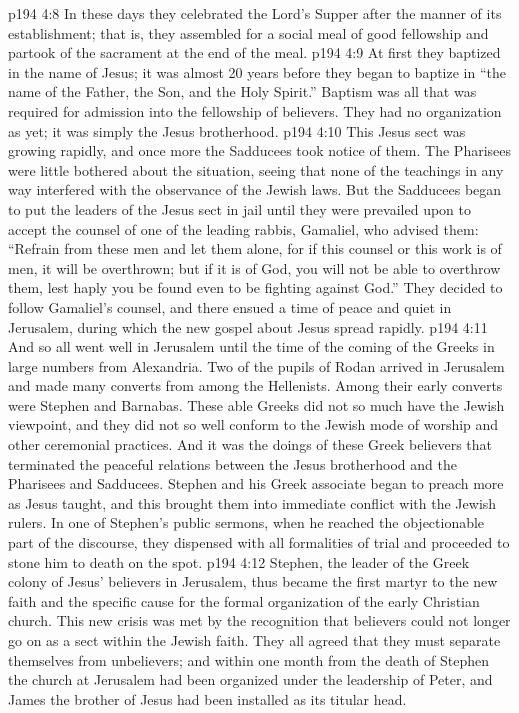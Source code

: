 \vs p194 4:8 \pc In these days they celebrated the Lord’s Supper after the manner of its establishment; that is, they assembled for a social meal of good fellowship and partook of the sacrament at the end of the meal.
\vs p194 4:9 \pc At first they baptized in the name of Jesus; it was almost 20 years before they began to baptize in “the name of the Father, the Son, and the Holy Spirit.” Baptism was all that was required for admission into the fellowship of believers. They had no organization as yet; it was simply the Jesus brotherhood.
\vs p194 4:10 \pc This Jesus sect was growing rapidly, and once more the Sadducees took notice of them. The Pharisees were little bothered about the situation, seeing that none of the teachings in any way interfered with the observance of the Jewish laws. But the Sadducees began to put the leaders of the Jesus sect in jail until they were prevailed upon to accept the counsel of one of the leading rabbis, Gamaliel, who advised them: “Refrain from these men and let them alone, for if this counsel or this work is of men, it will be overthrown; but if it is of God, you will not be able to overthrow them, lest haply you be found even to be fighting against God.” They decided to follow Gamaliel’s counsel, and there ensued a time of peace and quiet in Jerusalem, during which the new gospel about Jesus spread rapidly.
\vs p194 4:11 And so all went well in Jerusalem until the time of the coming of the Greeks in large numbers from Alexandria. Two of the pupils of Rodan arrived in Jerusalem and made many converts from among the Hellenists. Among their early converts were Stephen and Barnabas. These able Greeks did not so much have the Jewish viewpoint, and they did not so well conform to the Jewish mode of worship and other ceremonial practices. And it was the doings of these Greek believers that terminated the peaceful relations between the Jesus brotherhood and the Pharisees and Sadducees. Stephen and his Greek associate began to preach more as Jesus taught, and this brought them into immediate conflict with the Jewish rulers. In one of Stephen’s public sermons, when he reached the objectionable part of the discourse, they dispensed with all formalities of trial and proceeded to stone him to death on the spot.
\vs p194 4:12 Stephen, the leader of the Greek colony of Jesus’ believers in Jerusalem, thus became the first martyr to the new faith and the specific cause for the formal organization of the early Christian church. This new crisis was met by the recognition that believers could not longer go on as a sect within the Jewish faith. They all agreed that they must separate themselves from unbelievers; and within one month from the death of Stephen the church at Jerusalem had been organized under the leadership of Peter, and James the brother of Jesus had been installed as its titular head.
